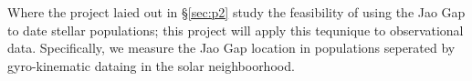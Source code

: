 Where the project laied out in \S \ref{sec:p2} study the feasibility of using the
Jao Gap to date stellar populations; this project will apply this tequnique to
observational data. Specifically, we measure the Jao Gap location in populations
seperated by gyro-kinematic dataing in the solar neighboorhood.
